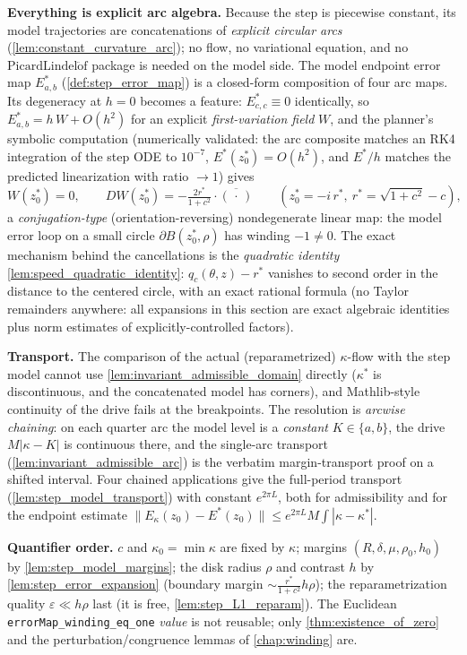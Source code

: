 \textbf{Everything is explicit arc algebra.} Because the step is piecewise constant, its
model trajectories are concatenations of \emph{explicit circular arcs}
(\cref{lem:constant_curvature_arc}); no flow, no variational equation, and no
$\mathrm{PicardLindel\ddot of}$ package is needed on the model side. The model endpoint
error map $E^\ast_{a,b}$ (\cref{def:step_error_map}) is a closed-form composition of
four arc maps. Its degeneracy at $h=0$ becomes a feature: $E^\ast_{c,c}\equiv0$
identically, so $E^\ast_{a,b}=h\,W+O(h^2)$ for an explicit \emph{first-variation field}
$W$, and the planner's symbolic computation (numerically validated: the arc composite
matches an RK4 integration of the step ODE to $10^{-7}$, $E^\ast(z_0^\ast)=O(h^2)$, and
$E^\ast/h$ matches the predicted linearization with ratio $\to1$) gives
\[
  W(z_0^\ast)=0,\qquad
  DW(z_0^\ast)=-\tfrac{2r^\ast}{1+c^2}\cdot\overline{(\,\cdot\,)}
  \qquad(z_0^\ast=-i\,r^\ast,\ r^\ast=\sqrt{1+c^2}-c),
\]
a \emph{conjugation-type} (orientation-reversing) nondegenerate linear map: the model
error loop on a small circle $\partial B(z_0^\ast,\rho)$ has winding $-1\ne0$. The exact
mechanism behind the cancellations is the \emph{quadratic identity}
\cref{lem:speed_quadratic_identity}: $q_c(\theta,z)-r^\ast$ vanishes to second order in
the distance to the centered circle, with an exact rational formula (no Taylor
remainders anywhere: all expansions in this section are exact algebraic identities plus
norm estimates of explicitly-controlled factors).

\textbf{Transport.} The comparison of the actual (reparametrized) $\kappa$-flow with the
step model cannot use \cref{lem:invariant_admissible_domain} directly ($\kappa^\ast$ is
discontinuous, and the concatenated model has corners), and Mathlib-style continuity of
the drive fails at the breakpoints. The resolution is \emph{arcwise chaining}: on each
quarter arc the model level is a \emph{constant} $K\in\{a,b\}$, the drive
$M|\kappa-K|$ is continuous there, and the single-arc transport
(\cref{lem:invariant_admissible_arc}) is the verbatim margin-transport proof on a
shifted interval. Four chained applications give the full-period transport
(\cref{lem:step_model_transport}) with constant $e^{2\pi L}$, both for admissibility and
for the endpoint estimate $\|E_\kappa(z_0)-E^\ast(z_0)\|\le e^{2\pi L}M\!\int|\kappa-
\kappa^\ast|$.

\textbf{Quantifier order.} $c$ and $\kappa_0=\min\kappa$ are fixed by $\kappa$; margins
$(R,\delta,\mu,\rho_0,h_0)$ by \cref{lem:step_model_margins}; the disk radius $\rho$ and
contrast $h$ by \cref{lem:step_error_expansion} (boundary margin
$\sim\tfrac{r^\ast}{1+c^2}h\rho$); the reparametrization quality $\varepsilon\ll h\rho$
last (it is free, \cref{lem:step_L1_reparam}). The Euclidean
\texttt{errorMap\_winding\_eq\_one} \emph{value} is not reusable; only
\cref{thm:existence_of_zero} and the perturbation/congruence lemmas of
\cref{chap:winding} are.

